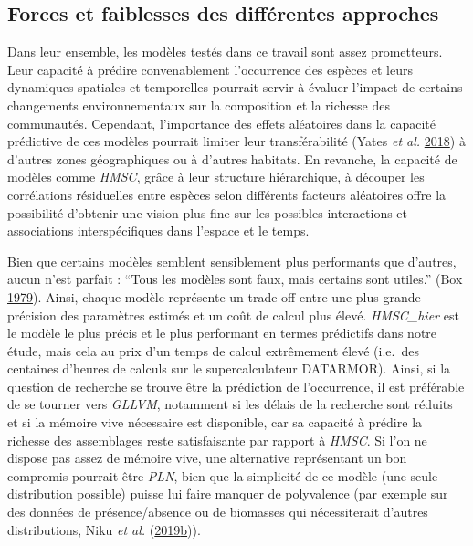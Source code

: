 \documentclass[12pt,]{article}
\begin{document}
\hypertarget{forces-et-faiblesses-des-diffuxe9rentes-approches}{%
\subsection{Forces et faiblesses des différentes
approches}\label{forces-et-faiblesses-des-diffuxe9rentes-approches}}

Dans leur ensemble, les modèles testés dans ce travail sont assez
prometteurs. Leur capacité à prédire convenablement l'occurrence des
espèces et leurs dynamiques spatiales et temporelles pourrait servir à
évaluer l'impact de certains changements environnementaux sur la
composition et la richesse des communautés. Cependant, l'importance des
effets aléatoires dans la capacité prédictive de ces modèles pourrait
limiter leur transférabilité (Yates \emph{et al.}
\protect\hyperlink{ref-Yates_2018}{2018}) à d'autres zones géographiques
ou à d'autres habitats. En revanche, la capacité de modèles comme
\emph{HMSC}, grâce à leur structure hiérarchique, à découper les
corrélations résiduelles entre espèces selon différents facteurs
aléatoires offre la possibilité d'obtenir une vision plus fine sur les
possibles interactions et associations interspécifiques dans l'espace et
le temps.

Bien que certains modèles semblent sensiblement plus performants que
d'autres, aucun n'est parfait : ``Tous les modèles sont faux, mais
certains sont utiles.'' (Box \protect\hyperlink{ref-Box_1979}{1979}).
Ainsi, chaque modèle représente un trade-off entre une plus grande
précision des paramètres estimés et un coût de calcul plus élevé.
\emph{HMSC\_hier} est le modèle le plus précis et le plus performant en
termes prédictifs dans notre étude, mais cela au prix d'un temps de
calcul extrêmement élevé (i.e.~des centaines d'heures de calculs sur le
supercalculateur DATARMOR). Ainsi, si la question de recherche se trouve
être la prédiction de l'occurrence, il est préférable de se tourner vers
\emph{GLLVM}, notamment si les délais de la recherche sont réduits et si
la mémoire vive nécessaire est disponible, car sa capacité à prédire la
richesse des assemblages reste satisfaisante par rapport à \emph{HMSC}.
Si l'on ne dispose pas assez de mémoire vive, une alternative
représentant un bon compromis pourrait être \emph{PLN}, bien que la
simplicité de ce modèle (une seule distribution possible) puisse lui
faire manquer de polyvalence (par exemple sur des données de
présence/absence ou de biomasses qui nécessiterait d'autres
distributions, Niku \emph{et al.}
(\protect\hyperlink{ref-Niku_2019}{2019}\protect\hyperlink{ref-Niku_2019}{b})).
\end{document}
